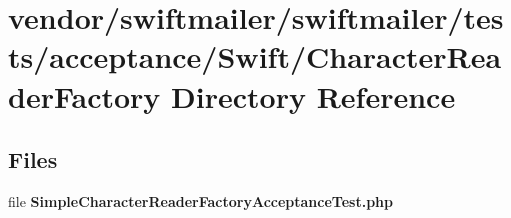\section{vendor/swiftmailer/swiftmailer/tests/acceptance/\+Swift/\+Character\+Reader\+Factory Directory Reference}
\label{dir_94afa76a5dd5e6315e9716c77ab60a3f}
\subsection*{Files}
\begin{DoxyCompactItemize}
\item 
file {\bf Simple\+Character\+Reader\+Factory\+Acceptance\+Test.\+php}
\end{DoxyCompactItemize}

